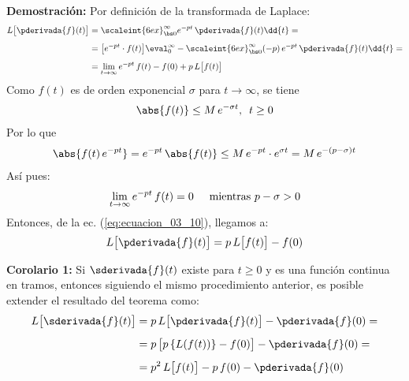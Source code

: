 \noindent \textbf{Demostración:} Por definición de la transformada de Laplace:
\begin{align}
\begin{aligned}[b]
L \big[  \pderivada{f}(t) \big] &= \scaleint{6ex}_{\bs 0}^{\infty} e^{-p t} \, \pderivada{f} (t) \dd{t} = \\[0.5em]
&= \big[ e^{-p t} \cdot f (t) \big] \eval_{0}^{\infty} - \scaleint{6ex}_{\bs 0}^{\infty} (-p) \, e^{-p t} \, \pderivada{f} (t) \dd{t} = \\[0.5em]
&= \lim_{t \to \infty} e^{-p t} \, f (t) - f(0) + p \, L \big[ f (t) \big]
\end{aligned}
\label{eq:ecuacion_03_10}
\end{align}
Como $f (t)$ es de orden exponencial $\sigma$ para $t \to \infty$, se tiene
\begin{align*}
\abs{f (t)} \leq M \, e^{-\sigma t}, \hspace{0.5em} t \geq 0
\end{align*}
Por lo que
\begin{align*}
\abs{f (t) \, e^{-p t}} = e^{-p t} \, \abs{f (t)} \leq M \, e^{-p t} \cdot e^{\sigma t} = M \, e^{-(p - \sigma) t}
\end{align*}
Así pues:
\begin{align*}
\lim_{t \to \infty} e^{-p t} \, f (t) = 0 \hspace{0.5cm} \mbox{mientras  } p - \sigma > 0
\end{align*}
Entonces, de la ec. (\ref{eq:ecuacion_03_10}), llegamos a:
\begin{align}
L \big[  \pderivada{f} (t)  \big] = p \, L \big[  f (t)  \big] - f (0)
\label{eq:ecuacion_03_11}
\end{align}

\noindent \textbf{Corolario 1: } Si $\sderivada{f} (t)$ existe para $t \geq 0$ y es una función continua en tramos, entonces siguiendo el mismo procedimiento anterior, es posible extender el resultado del teorema como:
\begin{align}
\begin{aligned}[b]
L \big[  \sderivada{f} (t)  \big] &= p \, L \big[  \pderivada{f} (t)  \big] - \pderivada{f} (0) = \\[0.5em]
&= p \, \big[  p \left\{ L (f (t)) \right\} - f (0)  \big] - \pderivada{f} (0) = \\[0.5em]
&= p^{2} \, L \big[  f (t)  \big] - p \, f (0) - \pderivada{f} (0)
\end{aligned}
\label{eq:ecuacion_03_12}
\end{align}

